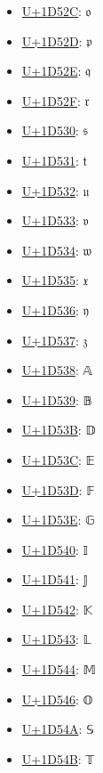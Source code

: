 \begin{itemize}
	\item \href{https://decodeunicode.org/en/u+1D52C}{U+1D52C}: 𝔬
	\item \href{https://decodeunicode.org/en/u+1D52D}{U+1D52D}: 𝔭
	\item \href{https://decodeunicode.org/en/u+1D52E}{U+1D52E}: 𝔮
	\item \href{https://decodeunicode.org/en/u+1D52F}{U+1D52F}: 𝔯
	\item \href{https://decodeunicode.org/en/u+1D530}{U+1D530}: 𝔰
	\item \href{https://decodeunicode.org/en/u+1D531}{U+1D531}: 𝔱
	\item \href{https://decodeunicode.org/en/u+1D532}{U+1D532}: 𝔲
	\item \href{https://decodeunicode.org/en/u+1D533}{U+1D533}: 𝔳
	\item \href{https://decodeunicode.org/en/u+1D534}{U+1D534}: 𝔴
	\item \href{https://decodeunicode.org/en/u+1D535}{U+1D535}: 𝔵
	\item \href{https://decodeunicode.org/en/u+1D536}{U+1D536}: 𝔶
	\item \href{https://decodeunicode.org/en/u+1D537}{U+1D537}: 𝔷
	\item \href{https://decodeunicode.org/en/u+1D538}{U+1D538}: 𝔸
	\item \href{https://decodeunicode.org/en/u+1D539}{U+1D539}: 𝔹
	\item \href{https://decodeunicode.org/en/u+1D53B}{U+1D53B}: 𝔻
	\item \href{https://decodeunicode.org/en/u+1D53C}{U+1D53C}: 𝔼
	\item \href{https://decodeunicode.org/en/u+1D53D}{U+1D53D}: 𝔽
	\item \href{https://decodeunicode.org/en/u+1D53E}{U+1D53E}: 𝔾
	\item \href{https://decodeunicode.org/en/u+1D540}{U+1D540}: 𝕀
	\item \href{https://decodeunicode.org/en/u+1D541}{U+1D541}: 𝕁
	\item \href{https://decodeunicode.org/en/u+1D542}{U+1D542}: 𝕂
	\item \href{https://decodeunicode.org/en/u+1D543}{U+1D543}: 𝕃
	\item \href{https://decodeunicode.org/en/u+1D544}{U+1D544}: 𝕄
	\item \href{https://decodeunicode.org/en/u+1D546}{U+1D546}: 𝕆
	\item \href{https://decodeunicode.org/en/u+1D54A}{U+1D54A}: 𝕊
	\item \href{https://decodeunicode.org/en/u+1D54B}{U+1D54B}: 𝕋

\end{itemize}
